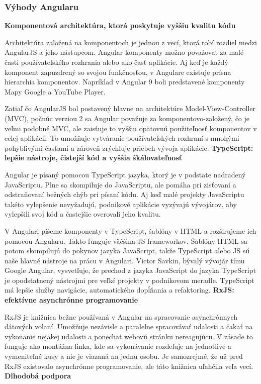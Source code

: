 \newpage

\subsubsection{Výhody Angularu}
\noindent\textbf{Komponentová architektúra, ktorá poskytuje vyššiu kvalitu kódu}

\indent  Architektúra založená na komponentoch je jednou z vecí, ktorá robí rozdiel medzi AngularJS a jeho nástupcom. Angular komponenty možno považovať za malé časti používateľského rozhrania alebo ako časť aplikácie. Aj keď je každý komponent zapuzdrený so svojou funkčnosťou, v Angulare existuje prísna hierarchia komponentov. Napríklad v Angular 9 boli predstavené komponenty Mapy Google a YouTube Player.

\indent Zatiaľ čo AngularJS bol postavený hlavne na architektúre Model-View-Controller (MVC), počnúc verziou 2 sa Angular považuje za komponentovo-založený, čo je veľmi podobné MVC, ale zaisťuje to vyššiu opätovnú použiteľnosť komponentov v celej aplikácii. To umožňuje vytváranie používateľských rozhraní s mnohými pohyblivými časťami a zároveň zrýchľuje priebeh vývoja aplikácie\cite{angular_1}. \newline
\textbf{TypeScript: lepšie nástroje, čistejší kód a vyššia škálovateľnosť}

\indent Angular je písaný pomocou TypeScript jazyka, ktorý je v podstate nadradený JavaScriptu. Plne sa skompiluje do JavaScriptu, ale pomáha pri zisťovaní a odstraňovaní bežných chýb pri písaní kódu. Aj keď malé projekty JavaScriptu takéto vylepšenie nevyžadujú, podnikové aplikácie vyzývajú vývojárov, aby vylepšili svoj kód a častejšie overovali jeho kvalitu.

\indent V Angulari píšeme komponenty v TypeScript, šablóny v HTML a rozširujeme ich pomocou Angularu. Takto funguje väčšina JS frameworkov. Šablóny HTML sa potom skompilujú do pokynov jazyka JavaScript, takže TypeScript alebo JS sú naše hlavné nástroje na prácu v Angulari. Victor Savkin, bývalý vývojár tímu Google Angular, vysvetľuje, že prechod z jazyka JavaScript do jazyka TypeScript je opodstatnený nástrojmi pre veľké projekty v podnikovom meradle. TypeScript má lepšie služby navigácie, automatického dopĺňania a refaktoring\cite{angular_1}.\newline
\textbf{RxJS: efektívne asynchrónne programovanie}

\indent RxJS je knižnica bežne používaná v Angular na spracovanie asynchrónnych dátových volaní. Umožňuje nezávisle a paralelne spracovávať udalosti a čakať na vykonanie nejakej udalosti a ponechať webovú stránku nereagujúcu. V zásade to funguje ako montážna linka, kde sa vykonávanie rozdeľuje na jednotlivé a vymeniteľné kusy a nie je viazaná na jednu osobu. Je samozrejmé, že už pred RxJS existovalo asynchrónne programovanie, ale táto knižnica uľahčila veľa vecí\cite{angular_1}.\newline
\textbf{Dlhodobá podpora}

